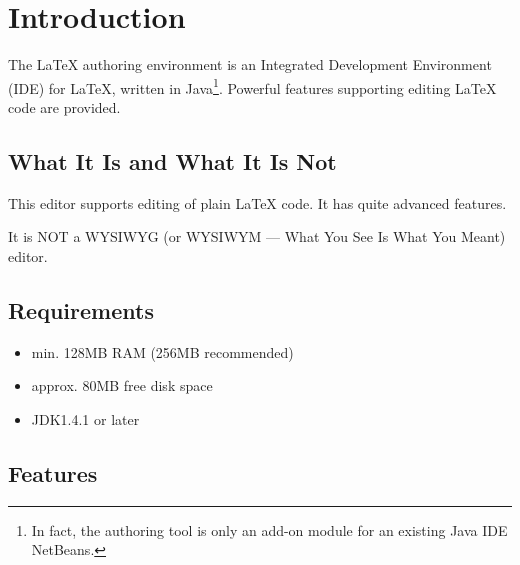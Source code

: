 \documentclass{article}
\title{\lenv}
\author{Jan Lahoda}
\begin{document}
\maketitle

\section{Introduction}

\label{ch:intro}

The \LaTeX{} authoring environment is an Integrated Development Environment
(IDE) for \LaTeX{}, written in Java\footnote{In fact, the authoring tool is
only an add-on module for an existing Java IDE NetBeans.}. Powerful features
supporting editing \LaTeX{} code are provided.

\subsection{What It Is and What It Is Not}

This editor supports editing of plain \LaTeX{} code. It has quite advanced features.

It is NOT a WYSIWYG (or WYSIWYM --- What You See Is What You Meant) editor.

\subsection{Requirements}

\label{sec:req}

\begin{itemize}
\item{min. 128MB RAM (256MB recommended)}
\item{approx. 80MB free disk space}
\item{JDK1.4.1 or later}
\end{itemize}

\subsection{Features}

\label{sec:features}
\end{document}
